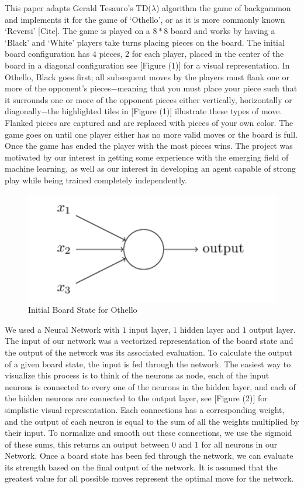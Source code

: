 \documentclass{sig-alternate-05-2015}
\begin{document}
This paper adapts Gerald Tesauro's TD(\(\lambda\)) algorithm the game of backgammon and implements it for the game of `Othello', or as it is more commonly known `Reversi' [Cite]. The game is played on a $8*8$ board and works by having a `Black' and `White' players take turns placing pieces on the board. The initial board configuration has $4$ pieces, $2$ for each player, placed in the center of the board in a diagonal configuration see [Figure (1)] for a visual representation. In Othello, Black goes first; all subsequent moves by the players  must flank one or more of the opponent's pieces$-$meaning that you must place your piece such that it surrounds one or more of the opponent pieces either vertically, horizontally or diagonally$-$the highlighted tiles in [Figure (1)] illustrate these types of move. Flanked pieces are captured and are replaced with pieces of your own color. The game goes on until one player either has no more valid moves or the board is full. Once the game has ended the player with the most pieces wins. The project was motivated by our interest in getting some experience with the emerging field of machine learning, as well as our interest in developing an agent capable of strong play while being trained completely independently. 

\begin{figure}[h!]
  \includegraphics[width=\linewidth]{neuron.png}
  \caption{Initial Board State for Othello}
  \label{fig:neuron1}
\end{figure}



We used a Neural Network with $1$ input layer, $1$ hidden layer and $1$ output layer. The input of our network was a vectorized representation of the board state and the output of the network was its associated evaluation. To calculate the output of a given board state, the input is fed through the network. The easiest way to visualize this process is to think of the neurons as node, each of the input neurons is connected to every one of the neurons in the hidden layer, and each of the hidden neurons are connected to the output layer, see [Figure (2)] for simplistic visual representation. Each connections has a corresponding weight, and the output of each neuron is equal to the sum of all the weights multiplied by their input. To normalize and smooth out these connections, we use the sigmoid of these sums, this returns an output between $0$ and $1$ for all neurons in our Network. Once a board state has been fed through the network, we can evaluate its strength based on the final output of the network. It is assumed that the greatest value for all possible moves represent the optimal move for the network.
\end{document}
